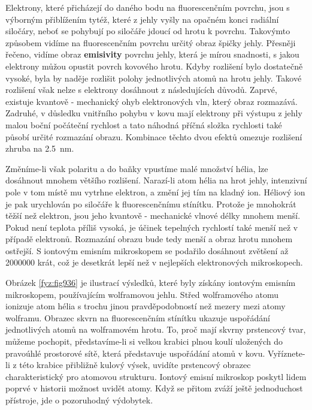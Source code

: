   Elektrony, které přicházejí do daného bodu na fluorescenčním povrchu, jsou s výborným přiblížením
  tytéž, které z jehly vyšly na opačném konci radiální siločáry, neboť se pohybují po siločáře
  jdoucí od hrotu k povrchu. Takovýmto způsobem vidíme na fluorescenčním povrchu určitý obraz špičky
  jehly. Přesněji řečeno, vidíme obraz \textbf{emisivity} povrchu jehly, která je mírou snadnosti, s
  jakou elektrony můžou opustit povrch kovového hrotu. Kdyby rozlišení bylo dostatečně vysoké, byla
  by naděje rozlišit polohy jednotlivých atomů na hrotu jehly. Takové rozlišení však nelze s
  elektrony dosáhnout z následujících důvodů. Zaprvé, existuje kvantově - mechanický ohyb
  elektronových vln, který obraz rozmazává. Zadruhé, v důsledku vnitřního pohybu v kovu mají
  elektrony při výstupu z jehly malou boční počáteční rychlost a tato náhodná příčná složka
  rychlosti také působí určité rozmazání obrazu. Kombinace těchto dvou efektů omezuje rozlišení
  zhruba na \SI{2.5}{\nm}.

  Změníme-li však polaritu a do baňky vpustíme malé množství hélia, lze dosáhnout mnohem většího
  rozlišení. Narazí-li atom hélia na hrot jehly, intenzivní pole v tom místě mu vytrhne elektron, a
  změní jej tím na kladný ion. Héliový ion je pak urychlován po siločáře k fluorescenčnímu stínítku.
  Protože je mnohokrát těžší než elektron, jsou jeho kvantově - mechanické vlnové délky mnohem
  menší. Pokud není teplota příliš vysoká, je účinek tepelných rychlostí také menší než v případě
  elektronů. Rozmazání obrazu bude tedy menší a obraz hrotu mnohem ostřejší. S iontovým emisním
  mikroskopem se podařilo dosáhnout zvětšení až \num{2000000} krát, což je desetkrát lepší než v
  nejlepších elektronových mikroskopech.

  Obrázek \ref{fyz:fig936} je ilustrací výsledků, které byly získány iontovým emisním mikroskopem,
  používajícím wolframovou jehlu. Střed wolframového atomu ionizuje atom hélia s trochu jinou
  pravděpodobností než mezery mezi atomy wolframu. Obrazec skvrn na fluorescenčním stínítku ukazuje
  uspořádání jednotlivých atomů na wolframovém hrotu. To, proč mají skvrny prstencový tvar, můžeme
  pochopit, představíme-li si velkou krabici plnou koulí uložených do pravoúhlé prostorové sítě,
  která představuje uspořádání atomů v kovu. Vyříznete-li z této krabice přibližně kulový výsek,
  uvidíte prstencový obrazec charakteristický pro atomovou strukturu. Iontový emisní mikroskop
  poskytl lidem poprvé v historii možnost uvidět atomy. Když se přitom zváží ještě jednoduchost
  přístroje, jde o pozoruhodný výdobytek.
  
